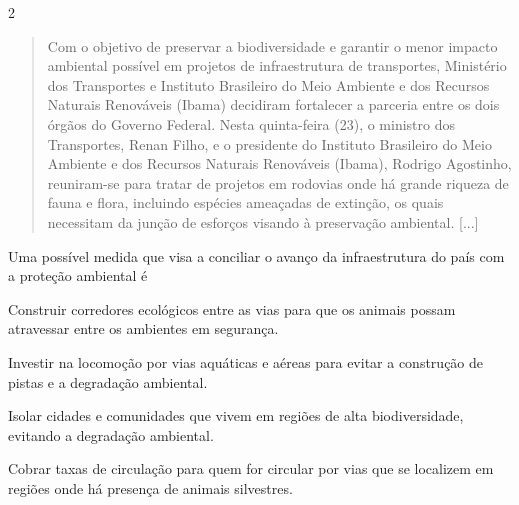 \num{2}
\begin{quote}
Com o objetivo de preservar a biodiversidade e garantir o menor
impacto ambiental possível em projetos de infraestrutura de
transportes, Ministério dos Transportes e Instituto Brasileiro do Meio
Ambiente e dos Recursos Naturais Renováveis (Ibama) decidiram
fortalecer a parceria entre os dois órgãos do Governo Federal. 
Nesta
quinta-feira (23), o ministro dos Transportes, Renan Filho, e o
presidente do Instituto Brasileiro do Meio Ambiente e dos Recursos
Naturais Renováveis (Ibama), Rodrigo Agostinho, reuniram-se para
tratar de projetos em rodovias onde há grande riqueza de fauna e
flora, incluindo espécies ameaçadas de extinção, os quais necessitam
da junção de esforços visando à preservação ambiental. [...]

\end{quote}

Uma possível medida que visa a conciliar o avanço da infraestrutura do país com a proteção ambiental é

\begin{escolha}
\item
  Construir corredores ecológicos entre as vias para que os animais
  possam atravessar entre os ambientes em segurança.
\item
  Investir na locomoção por vias aquáticas e aéreas para evitar a
  construção de pistas e a degradação ambiental.
\item
  Isolar cidades e comunidades que vivem em regiões de alta
  biodiversidade, evitando a degradação ambiental.
\item
  Cobrar taxas de circulação para quem for circular por vias que se
  localizem em regiões onde há presença de animais silvestres.
\end{escolha}


